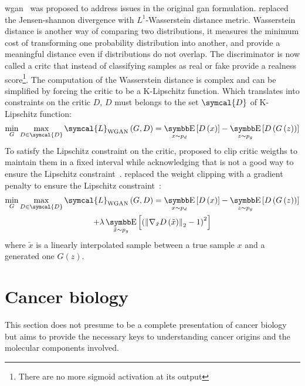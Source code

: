 \documentclass[../main.tex]{subfiles}
\begin{document}
		\Gls{wgan}~\cite{WGAN} was proposed to address issues in the original \gls{gan} formulation.
		\citeauthor{WGAN} replaced the Jensen-shannon divergence with \(L^{1}\)-Wasserstein distance metric.
		Wasserstein distance is another way of comparing two distributions, it measures the minimum cost of transforming one probability distribution into another, and provide a meaningful distance even if distributions do not overlap.
		The discriminator is now called a critc that instead of classifying samples as real or fake provide a realness score\footnote{There are no more sigmoid activation at its output}.
		The computation of the Wasserstein distance is complex and can be simplified by forcing the critic to be a K-Lipschitz function.
		Which translates into constraints on the critic \(D\), \(D\) must belongs to the set \( \symcal{D}\) of K-Lipschitz function:
		\begin{equation}
			\min_{G} \max_{D\in \symcal{D}} \symcal{L}_{\text{WGAN}}\left(G,D\right) = \E_{x\sim p_{d}}\left[ D\left(x\right)\right] - \E_{z\sim p_{g}}\left[ D\left(G\left(z\right)\right)\right] \label{eq:wgan_loss}
		\end{equation}
		To satisfy the Lipschitz constraint on the critic, \citeauthor{WGAN} proposed to clip critic weigths to maintain them in a fixed interval while acknowledging that is not a good way to ensure the Lipschitz constraint~\cite{WGAN}.
		\citeauthor{WGANGP} replaced the weight clipping with a gradient penalty to ensure the Lipschitz constraint~\cite{WGANGP}:
		\begin{multline}
			\min_{G} \max_{D\in \symcal{D}} \symcal{L}_{\text{WGAN}}\left(G,D\right) = \E_{x\sim p_{d}}\left[ D\left(x\right)\right] - \E_{z\sim p_{g}}\left[ D\left(G\left(z\right)\right)\right] \\ + \lambda \E_{\tilde{x}\sim p_{g}}\left[ {\left( {\left\|\nabla_{\tilde{x}}D\left(\tilde{x}\right) \right\|}_{2} -1 \right)}^{2}\right]  \label{eq:wgangp_loss}
		\end{multline}
		where \(\tilde{x}\) is a linearly interpolated sample between a true sample \(x\) and a generated one \(G\left(z\right)\).

\section{Cancer biology}
	This section does not presume to be a complete presentation of cancer biology but aims to provide the necessary keys to understanding cancer origins and the molecular components involved.
\end{document}
